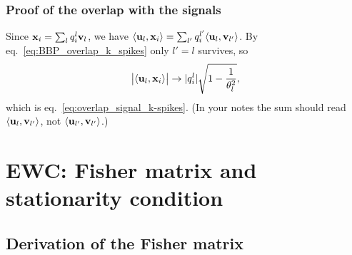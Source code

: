 \subsubsection{Proof of the overlap with the signals}

Since $\boldsymbol{\mathbf{x}}_i=\sum_{l}q_i^l\boldsymbol{\mathbf{v}}_l$, we have $\langle\boldsymbol{\mathbf{u}}_l,\boldsymbol{\mathbf{x}}_i\rangle=\sum_{l'}q_i^{l'}\langle\boldsymbol{\mathbf{u}}_l,\boldsymbol{\mathbf{v}}_{l'}\rangle$. By eq.~\eqref{eq:BBP_overlap_k_spikes} only $l'=l$ survives, so
\[
\big|\langle\boldsymbol{\mathbf{u}}_l,\boldsymbol{\mathbf{x}}_i\rangle\big|\to|q_i^l|\sqrt{1-\frac1{\theta_l^2}},
\]
which is eq.~\eqref{eq:overlap_signal_k-spikes}. (In your notes the sum should read $\langle\boldsymbol{\mathbf{u}}_l,\boldsymbol{\mathbf{v}}_{l'}\rangle$, not $\langle\boldsymbol{\mathbf{u}}_{l'},\boldsymbol{\mathbf{v}}_{l'}\rangle$.)


\section{EWC: Fisher matrix and stationarity condition}

\subsection{Derivation of the Fisher matrix}\label{adix:fisher}

